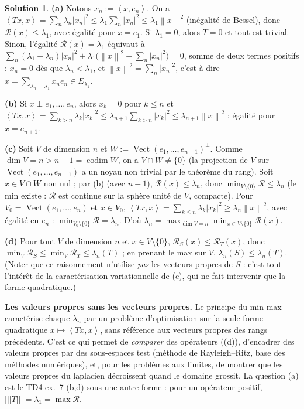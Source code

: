 \documentclass[11pt,a4paper]{article}
\newcommand{\Vect}{\operatorname{Vect}}
\newcommand{\norm}[1]{\left\|#1\right\|}
\newcommand{\opnorm}[1]{|\!|\!|#1|\!|\!|}
\newcommand{\ps}[2]{\left\langle #1,#2\right\rangle}
\newcommand{\ie}{c'est-à-dire}
\theoremstyle{definition}
\newtheorem*{solution}{Solution}
\begin{document}
\begin{solution}
\noindent\textbf{(a)} Notons $x_n:=\ps x{e_n}$. On a $\ps{Tx}x=\sum_n\lambda_n|x_n|^2\le\lambda_1\sum_n|x_n|^2\le\lambda_1\norm x^2$ (inégalité de Bessel), donc $\mathcal R(x)\le\lambda_1$, avec égalité pour $x=e_1$. Si $\lambda_1=0$, alors $T=0$ et tout est trivial. Sinon, l'égalité $\mathcal R(x)=\lambda_1$ équivaut à $\sum_n(\lambda_1-\lambda_n)|x_n|^2+\lambda_1\big(\norm x^2-\sum_n|x_n|^2\big)=0$, somme de deux termes positifs : $x_n=0$ dès que $\lambda_n<\lambda_1$, et $\norm x^2=\sum_n|x_n|^2$, \ie{} $x=\sum_{\lambda_n=\lambda_1}x_ne_n\in E_{\lambda_1}$.

\medskip
\noindent\textbf{(b)} Si $x\perp e_1,\dots,e_n$, alors $x_k=0$ pour $k\le n$ et $\ps{Tx}x=\sum_{k>n}\lambda_k|x_k|^2\le\lambda_{n+1}\sum_{k>n}|x_k|^2\le\lambda_{n+1}\norm x^2$ ; égalité pour $x=e_{n+1}$.

\medskip
\noindent\textbf{(c)} Soit $V$ de dimension $n$ et $W:=\Vect(e_1,\dots,e_{n-1})^\perp$. Comme $\dim V=n>n-1=\operatorname{codim}W$, on a $V\cap W\ne\{0\}$ (la projection de $V$ sur $\Vect(e_1,\dots,e_{n-1})$ a un noyau non trivial par le théorème du rang). Soit $x\in V\cap W$ non nul ; par (b) (avec $n-1$), $\mathcal R(x)\le\lambda_n$, donc $\min_{V\setminus\{0\}}\mathcal R\le\lambda_n$ (le min existe : $\mathcal R$ est continue sur la sphère unité de $V$, compacte). Pour $V_0=\Vect(e_1,\dots,e_n)$ et $x\in V_0$, $\ps{Tx}x=\sum_{k\le n}\lambda_k|x_k|^2\ge\lambda_n\norm x^2$, avec égalité en $e_n$ : $\min_{V_0\setminus\{0\}}\mathcal R=\lambda_n$. D'où $\lambda_n=\max_{\dim V=n}\min_{x\in V\setminus\{0\}}\mathcal R(x)$.

\medskip
\noindent\textbf{(d)} Pour tout $V$ de dimension $n$ et $x\in V\setminus\{0\}$, $\mathcal R_S(x)\le\mathcal R_T(x)$, donc $\min_V\mathcal R_S\le\min_V\mathcal R_T\le\lambda_n(T)$ ; en prenant le max sur $V$, $\lambda_n(S)\le\lambda_n(T)$. (Noter que ce raisonnement n'utilise \emph{pas} les vecteurs propres de $S$ : c'est tout l'intérêt de la caractérisation variationnelle de (c), qui ne fait intervenir que la forme quadratique.)
\end{solution}

\begin{pointcle}
\textbf{Les valeurs propres sans les vecteurs propres.} Le principe du min-max caractérise chaque $\lambda_n$ par un problème d'optimisation sur la seule forme quadratique $x\mapsto\ps{Tx}x$, sans référence aux vecteurs propres des rangs précédents. C'est ce qui permet de \emph{comparer} des opérateurs ((d)), d'encadrer des valeurs propres par des sous-espaces test (méthode de Rayleigh--Ritz, base des méthodes numériques), et, pour les problèmes aux limites, de montrer que les valeurs propres du laplacien décroissent quand le domaine grossit. La question (a) est le TD4 ex.~7 (b,d) sous une autre forme : pour un opérateur positif, $\opnorm T=\lambda_1=\max\mathcal R$.
\end{pointcle}
\end{document}
